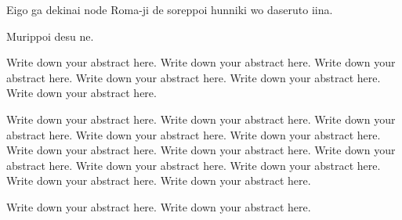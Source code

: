\begin{eabstract}

Eigo ga dekinai node Roma-ji de soreppoi hunniki wo daseruto iina.

Murippoi desu ne.

Write down your abstract here. Write down your abstract here. Write down your abstract here. Write down your abstract here. Write down your abstract here. Write down your abstract here.

 Write down your abstract here. Write down your abstract here. Write down your abstract here. Write down your abstract here. Write down your abstract here. Write down your abstract here. Write down your abstract here. Write down your abstract here. Write down your abstract here. Write down your abstract here. Write down your abstract here. Write down your abstract here.

Write down your abstract here. Write down your abstract here.

\end{eabstract}
